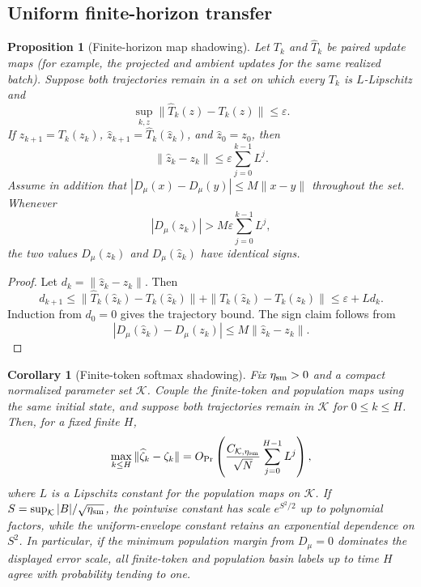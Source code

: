 \documentclass[11pt]{article}
\newtheorem{proposition}[theorem]{Proposition}
\newtheorem{corollary}[theorem]{Corollary}
\begin{document}
\subsection{Uniform finite-horizon transfer}

\begin{proposition}[Finite-horizon map shadowing]
\label{prop:shadowing}
Let \(T_k\) and \(\widehat T_k\) be paired update maps (for example, the
projected and ambient updates for the same realized batch).  Suppose both
trajectories remain in a set on which every \(T_k\) is \(L\)-Lipschitz and
\[
\sup_{k,z}\|\widehat T_k(z)-T_k(z)\|\le\varepsilon.
\]
If \(z_{k+1}=T_k(z_k)\),
\(\widehat z_{k+1}=\widehat T_k(\widehat z_k)\), and
\(\widehat z_0=z_0\), then
\[
\|\widehat z_k-z_k\|
\le
\varepsilon\sum_{j=0}^{k-1}L^j.
\]
Assume in addition that
\(|D_\mu(x)-D_\mu(y)|\le M\|x-y\|\) throughout the set.  Whenever
\[
|D_\mu(z_k)|
>
M\varepsilon\sum_{j=0}^{k-1}L^j,
\]
the two values \(D_\mu(z_k)\) and \(D_\mu(\widehat z_k)\) have identical
signs.
\end{proposition}

\begin{proof}
Let \(d_k=\|\widehat z_k-z_k\|\).  Then
\[
d_{k+1}
\le
\|\widehat T_k(\widehat z_k)-T_k(\widehat z_k)\|
+\|T_k(\widehat z_k)-T_k(z_k)\|
\le\varepsilon+Ld_k.
\]
Induction from \(d_0=0\) gives the trajectory bound.  The sign claim follows
from
\[
|D_\mu(\widehat z_k)-D_\mu(z_k)|
\le M\|\widehat z_k-z_k\|.
\]
\end{proof}

\begin{corollary}[Finite-token softmax shadowing]
\label{cor:softmax-shadowing}
Fix \(\eta_{\rm sm}>0\) and a compact normalized parameter set
\(\mathcal K\).  Couple the finite-token and population maps using the same
initial state, and suppose both trajectories remain in \(\mathcal K\) for
\(0\le k\le H\).  Then, for a fixed finite \(H\),
\[
\max_{k\le H}\|\widehat\zeta_k-\zeta_k\|
=
O_{\Pr}\left(
\frac{C_{\mathcal K,\eta_{\rm sm}}}{\sqrt N}
\sum_{j=0}^{H-1}L^j
\right),
\]
where \(L\) is a Lipschitz constant for the population maps on
\(\mathcal K\).  If \(S=\sup_{\mathcal K}|B|/\sqrt{\eta_{\rm sm}}\), the
pointwise constant has scale \(e^{S^2/2}\) up to polynomial factors, while
the uniform-envelope constant retains an exponential dependence on \(S^2\).
In particular, if the minimum population margin from \(D_\mu=0\) dominates
the displayed error scale, all finite-token and population basin labels up
to time \(H\) agree with probability tending to one.
\end{corollary}
\end{document}
